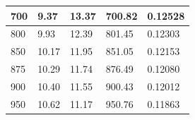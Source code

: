 \documentclass[twocolumn,english]{IEEEtran}
\theoremstyle{plain}
\theoremstyle{plain}
\begin{document}
\begin{table}[htpb]
\begin{tabular}{|l|l|l|l|l|}
700                                                                                              & 9.37                                                                                & 13.37                                                                                & 700.82                                                                                               & 0.12528                              \\ \hline
800                                                                                              & 9.93                                                                                & 12.39                                                                                & 801.45                                                                                               & 0.12303                              \\ \hline
850                                                                                              & 10.17                                                                               & 11.95                                                                                & 851.05                                                                                               & 0.12153                              \\ \hline
875                                                                                              & 10.29                                                                               & 11.74                                                                                & 876.49                                                                                               & 0.12080                              \\ \hline
900                                                                                              & 10.40                                                                               & 11.55                                                                                & 900.43                                                                                               & 0.12012                              \\ \hline
950                                                                                              & 10.62                                                                               & 11.17                                                                                & 950.76                                                                                               & 0.11863                              \\ \hline

\end{tabular}
\end{table}
\end{document}
